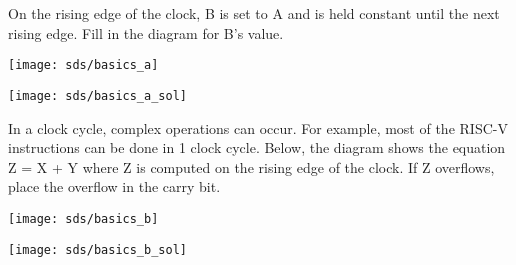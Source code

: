 \begin{blocksection}
\question
On the rising edge of the clock, B is set to A and is held constant until the next rising edge.  Fill in the diagram for B’s value.

\texttt{[image: sds/basics\_a]}
\begin{solution}
\texttt{[image: sds/basics\_a\_sol]}
\end{solution}

In a clock cycle, complex operations can occur.  For example, most of the RISC-V instructions can be done in 1 clock cycle.  Below, the diagram shows the equation Z = X + Y where Z is computed on the rising edge of the clock.  If Z overflows, place the overflow in the carry bit.

\texttt{[image: sds/basics\_b]}
\begin{solution}
\texttt{[image: sds/basics\_b\_sol]}
\end{solution}

\end{blocksection}
